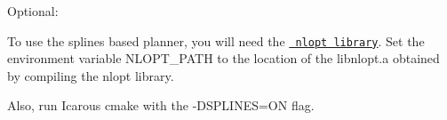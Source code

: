 Optional\+:

To use the splines based planner, you will need the \href{https://github.com/stevengj/nlopt}{\texttt{ nlopt library}}. Set the environment variable NLOPT\+\_\+\+PATH to the location of the libnlopt.\+a obtained by compiling the nlopt library.

Also, run Icarous cmake with the {\ttfamily -\/DSPLINES=ON} flag. 